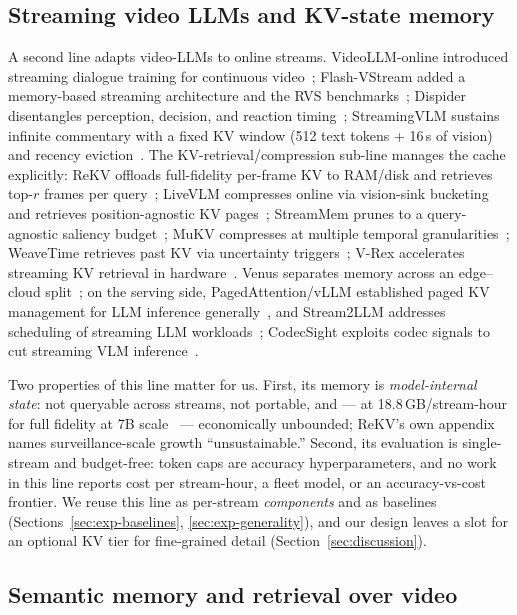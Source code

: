 \subsection{Streaming video LLMs and KV-state memory}
\label{sec:related-kv}

A second line adapts video-LLMs to online streams. VideoLLM-online introduced streaming dialogue training for continuous video~\cite{videollmonline}; Flash-VStream added a memory-based streaming architecture and the RVS benchmarks~\cite{flashvstream}; Dispider disentangles perception, decision, and reaction timing~\cite{dispider}; StreamingVLM sustains infinite commentary with a fixed KV window (512 text tokens + 16\,s of vision) and recency eviction~\cite{streamingvlm}. The KV-retrieval/compression sub-line manages the cache explicitly: ReKV offloads full-fidelity per-frame KV to RAM/disk and retrieves top-$r$ frames per query~\cite{rekv}; LiveVLM compresses online via vision-sink bucketing and retrieves position-agnostic KV pages~\cite{livevlm}; StreamMem prunes to a query-agnostic saliency budget~\cite{streammem}; MuKV compresses at multiple temporal granularities~\cite{mukv}; WeaveTime retrieves past KV via uncertainty triggers~\cite{weavetime}; V-Rex accelerates streaming KV retrieval in hardware~\cite{vrex}. Venus separates memory across an edge--cloud split~\cite{venus}; on the serving side, PagedAttention/vLLM established paged KV management for LLM inference generally~\cite{vllm}, and Stream2LLM addresses scheduling of streaming LLM workloads~\cite{stream2llm}; CodecSight exploits codec signals to cut streaming VLM inference~\cite{codecsight}.

Two properties of this line matter for us. First, its memory is \emph{model-internal state}: not queryable across streams, not portable, and --- at 18.8\,GB/stream-hour for full fidelity at 7B scale~\cite{rekv} --- economically unbounded; ReKV's own appendix names surveillance-scale growth ``unsustainable.'' Second, its evaluation is single-stream and budget-free: token caps are accuracy hyperparameters, and no work in this line reports cost per stream-hour, a fleet model, or an accuracy-vs-cost frontier. We reuse this line as per-stream \emph{components} and as baselines (Sections~\ref{sec:exp-baselines}, \ref{sec:exp-generality}), and our design leaves a slot for an optional KV tier for fine-grained detail (Section~\ref{sec:discussion}).

\subsection{Semantic memory and retrieval over video}
\label{sec:related-semantic}


